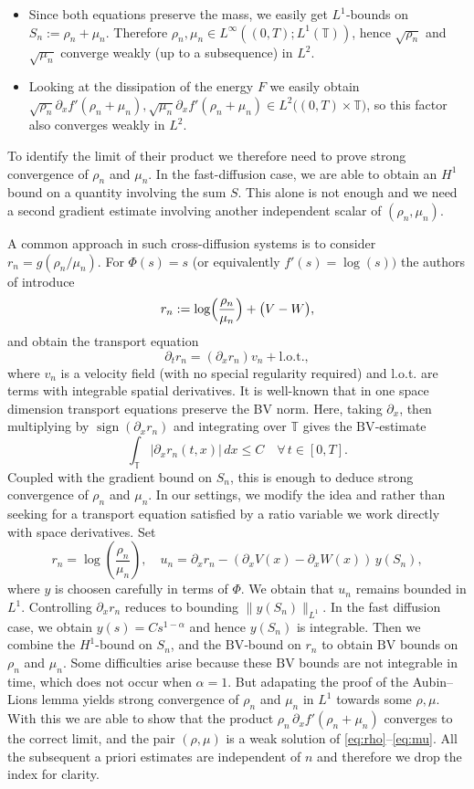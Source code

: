 \documentclass[a4paper,twosided, 11pt]{article}
\newcommand {\T}  { {\mathbb{T}} }
\theoremstyle{plain}
\theoremstyle{remark}
\numberwithin{equation}{section}
\begin{document}
\begin{itemize}
\item    Since both equations preserve the mass, we easily get 
      $L^1$‐bounds on $S_n:=\rho_n+\mu_n$.  Therefore
      $\rho_n,\mu_n\in L^\infty((0,T);L^1(\T))$, hence $\sqrt{\rho_n}$ and $\sqrt{\mu_n}$  converge
      weakly (up to a subsequence)  in $L^2$.
\item  Looking at the dissipation of the energy $F$ we easily obtain
      $\sqrt{\rho_n}\partial_x f'(\rho_n+\mu_n), \sqrt{\mu_n}\partial_x f'(\rho_n+\mu_n)\in L^2\bigl((0,T)\times\T\bigr)$, so this factor
      also converges weakly in $L^2$.
\end{itemize}

To identify the limit of their product we therefore need to prove strong convergence
 of $\rho_n$ and $\mu_n$. In the fast-diffusion case, we are able to obtain an $H^1$ bound on a quantity involving the sum $S$. This alone is not enough and we need a second gradient estimate involving another independent scalar of $(\rho_n,\mu_n)$.

A common approach in such cross-diffusion systems is to consider
$r_n=g(\rho_n/\mu_n)$.  For $\Phi(s)=s$ (or equivalently $f'(s)=\log(s))$ the authors of \cite{2025arXiv250418484M} introduce
$$
r_n:=\log\Bigl(\frac{\rho_n}{\mu_n}\Bigr)+\bigl(V-W\bigr),
$$
and obtain the transport equation
$$
\partial_t r_n  =  (\partial_x r_n)v_n  + \text{l.o.t.},
$$
where $v_n$ is a velocity field (with no special regularity required) and l.o.t. are terms
with integrable spatial derivatives. It is well-known that in one space dimension transport equations preserve the BV norm. Here, taking $\partial_x$, then
multiplying by $\operatorname{sign}(\partial_x r_n)$ and integrating over $\T$
gives the $\mathrm{BV}$‐estimate
$$
\int_\T\lvert\partial_x r_n(t,x)\rvert\,dx  \le  C\quad
\forall\,t\in[0,T].
$$
Coupled with the gradient bound on $S_n$, this is enough to deduce strong
convergence of $\rho_n$ and $\mu_n$. In our settings, we modify the idea and rather than seeking for a transport equation satisfied by a ratio variable we work directly
with space derivatives. Set
$$
r_n=\log\left(\frac{\rho_n}{\mu_n}\right),\quad
u_n=\partial_x r_n-(\partial_x V(x) - \partial_x W(x))\, y(S_n),
$$
where
$y$ is choosen carefully in terms of $\Phi$.  We obtain that $u_n$ remains bounded in $L^1$.  Controlling $\partial_x r_n$ reduces to bounding
$\|y(S_n)\|_{L^1}$. In the fast diffusion case, we obtain $y(s)=Cs^{1-\alpha}$ and hence $y(S_n)$ is integrable. Then we combine the $H^1$-bound on $S_n$, and the $\mathrm{BV}$‐bound on $r_n$ to obtain $\mathrm{BV}$ bounds on $\rho_n$ and $\mu_n$. Some difficulties arise because these $\mathrm{BV}$ bounds are not integrable in time, which does not occur when $\alpha=1$. But adapating the proof of the Aubin–Lions lemma yields strong convergence of $\rho_n$ and $\mu_n$ in $L^1$ towards some $\rho,\mu$.
With this we are able to show that the product $\rho_n\,\partial_x f'(\rho_n+\mu_n)$ converges to the correct limit, and the pair $(\rho,\mu)$ is a weak solution of \eqref{eq:rho}--\eqref{eq:mu}. All the subsequent a priori estimates are independent of $n$ and therefore we drop the index for clarity.
\end{document}
